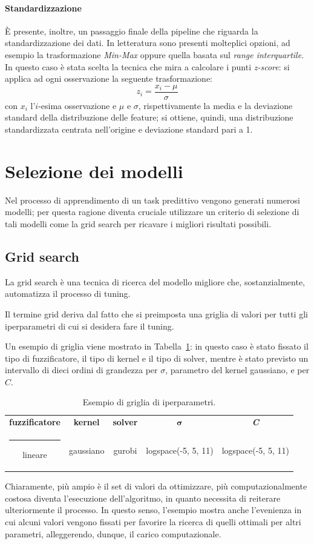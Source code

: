 \documentclass[12pt]{report}
\makeatletter
\theoremstyle{definition}
\newcommand{\thickhline}{%
    \noalign {\ifnum 0=`}\fi \hrule height 1pt
    \futurelet \reserved@a \@xhline
}
\makeatother
\begin{document}
\paragraph{Standardizzazione}\label{standardization}
È presente, inoltre, un passaggio finale della pipeline che riguarda la standardizzazione dei dati. In letteratura sono presenti molteplici opzioni, ad esempio la trasformazione \textit{Min-Max} oppure quella basata sul \textit{range interquartile}. In questo caso è stata scelta la tecnica che mira a calcolare i punti \textit{z-score}: si applica ad ogni osservazione la seguente trasformazione:
\begin{equation}
    z_i = \frac{x_i - \mu}{\sigma}
\end{equation}
con $x_i$ l'$i$-esima osservazione e $\mu$ e $\sigma$, rispettivamente la media e la deviazione standard della distribuzione delle feature; si ottiene, quindi, una distribuzione standardizzata centrata nell'origine e deviazione standard pari a 1.

\section{Selezione dei modelli}\label{modelselection}
Nel processo di apprendimento di un task predittivo vengono generati numerosi modelli; per questa ragione diventa cruciale utilizzare un criterio di selezione di tali modelli come la grid search per ricavare i migliori risultati possibili.

\subsection{Grid search}\label{gs}
La grid search è una tecnica di ricerca del modello migliore che, sostanzialmente, automatizza il processo di tuning.

Il termine grid deriva dal fatto che si preimposta una griglia di valori per tutti gli iperparametri di cui si desidera fare il tuning.

Un esempio di griglia viene mostrato in Tabella~\ref{grid}: in questo caso è stato fissato il tipo di fuzzificatore, il tipo di kernel e il tipo di solver, mentre è stato previsto un intervallo di dieci ordini di grandezza per $\sigma$, parametro del kernel gaussiano, e per $C$.
\begin{table}
\centering
 \begin{tabular}{|c|c|c|c|c|} 
 \hline
\textbf{fuzzificatore} & \textbf{kernel} & \textbf{solver} & $\bm{\sigma}$ & \textit{\textbf{C}} 
\\ [0.5ex] 
 \thickhline
 lineare & gaussiano & gurobi & logspace(-5, 5, 11) & logspace(-5, 5, 11) \\ 
 \hline
\end{tabular}
\caption{Esempio di griglia di iperparametri.}
\label{grid}
\end{table}
Chiaramente, più ampio è il set di valori da ottimizzare, più computazionalmente costosa diventa l'esecuzione dell'algoritmo, in quanto necessita di reiterare ulteriormente il processo. In questo senso, l'esempio mostra anche l'evenienza in cui alcuni valori vengono fissati per favorire la ricerca di quelli ottimali per altri parametri, alleggerendo, dunque, il carico computazionale.
\end{document}
